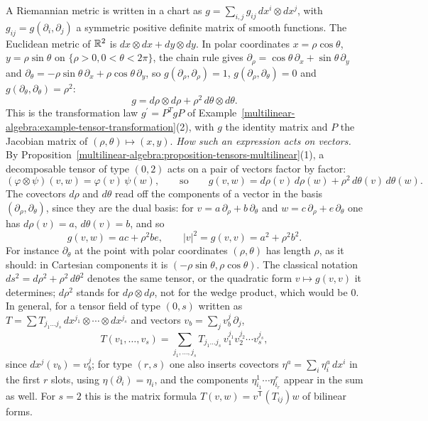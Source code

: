 \begin{example}\label{vector-bundles:example-metric-coordinates}
A Riemannian metric is written in a chart as $g = \sum_{i,j}g_{ij}\,dx^i \otimes dx^j$, with $g_{ij} = g(\partial_i, \partial_j)$ a symmetric positive definite matrix of smooth functions. The
Euclidean metric of $\mathbb{R}^2$ is $dx \otimes dx + dy \otimes dy$. In polar coordinates $x = \rho\cos\theta$, $y = \rho\sin\theta$ on $\{\rho > 0, 0 < \theta < 2\pi\}$, the chain rule gives
$\partial_\rho = \cos\theta\,\partial_x + \sin\theta\,\partial_y$ and $\partial_\theta = -\rho\sin\theta\,\partial_x + \rho\cos\theta\,\partial_y$, so
$g(\partial_\rho, \partial_\rho) = 1$, $g(\partial_\rho, \partial_\theta) = 0$ and $g(\partial_\theta, \partial_\theta) = \rho^2$:
\[
g = d\rho \otimes d\rho + \rho^2\,d\theta \otimes d\theta .
\]
This is the transformation law $g^{\prime} = P^TgP$ of Example~\ref{multilinear-algebra:example-tensor-transformation}(2), with $g$ the identity matrix and $P$ the Jacobian matrix of
$(\rho, \theta) \mapsto (x, y)$.
\emph{How such an expression acts on vectors.} By Proposition~\ref{multilinear-algebra:proposition-tensors-multilinear}(1), a decomposable tensor of type $(0,2)$ acts on a pair of vectors factor by factor:
\[
(\varphi \otimes \psi)(v, w) = \varphi(v)\,\psi(w), \qquad\text{so}\qquad g(v, w) = d\rho(v)\,d\rho(w) + \rho^2\,d\theta(v)\,d\theta(w).
\]
The covectors $d\rho$ and $d\theta$ read off the components of a vector in the basis $(\partial_\rho, \partial_\theta)$, since they are the dual basis: for $v = a\,\partial_\rho + b\,\partial_\theta$ and
$w = c\,\partial_\rho + e\,\partial_\theta$ one has $d\rho(v) = a$, $d\theta(v) = b$, and so
\[
g(v, w) = ac + \rho^2be, \qquad |v|^2 = g(v, v) = a^2 + \rho^2b^2 .
\]
For instance $\partial_\theta$ at the point with polar coordinates $(\rho, \theta)$ has length $\rho$, as it should: in Cartesian components it is $(-\rho\sin\theta, \rho\cos\theta)$. The classical notation
$ds^2 = d\rho^2 + \rho^2\,d\theta^2$ denotes the same tensor, or the quadratic form $v \mapsto g(v, v)$ it determines; $d\rho^2$ stands for $d\rho \otimes d\rho$, not for the wedge product, which would be $0$.
In general, for a tensor field of type $(0,s)$ written as $T = \sum T_{j_1 \ldots j_s}\,dx^{j_1} \otimes \cdots \otimes dx^{j_s}$ and vectors $v_b = \sum_jv_b^j\,\partial_j$,
\[
T(v_1, \ldots, v_s) = \sum_{j_1, \ldots, j_s}T_{j_1 \ldots j_s}\,v_1^{j_1}v_2^{j_2} \cdots v_s^{j_s},
\]
since $dx^j(v_b) = v_b^j$; for type $(r,s)$ one also inserts covectors $\eta^a = \sum_i\eta^a_i\,dx^i$ in the first $r$ slots, using $\eta(\partial_i) = \eta_i$, and the components $\eta^1_{i_1} \cdots \eta^r_{i_r}$ appear
in the sum as well. For $s = 2$ this is the matrix formula $T(v, w) = v^{\mathsf T}(T_{ij})w$ of bilinear forms.
\end{example}

